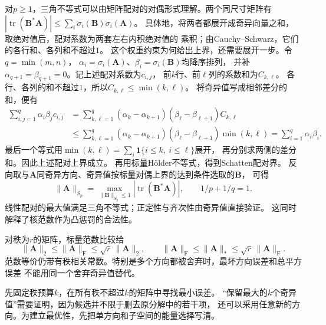 对$p\geq1$，三角不等式可以由矩阵配对的对偶形式理解。两个同尺寸矩阵有
$|\operatorname{tr}(\bm B^*\bm A)|
\leq\sum_i\sigma_i(\bm B)\sigma_i(\bm A)$。
具体地，将两者都展开成奇异向量之和，取绝对值后，配对系数为两套左右内积绝对值的
乘积；由Cauchy--Schwarz，它们的各行和、各列和不超过$1$。
这个权重约束为何给出上界，还需要展开一步。令$q=\min(m,n)$，
$\alpha_i=\sigma_i(\bm A)$、$\beta_i=\sigma_i(\bm B)$均降序排列，
并补$\alpha_{q+1}=\beta_{q+1}=0$。记上述配对系数为$c_{i,j}$，
前$k$行、前$\ell$列的系数和为$C_{k,\ell}$。
各行、各列的和不超过$1$，所以$C_{k,\ell}\leq\min(k,\ell)$。
将奇异值写成相邻差分的和，便有
\[
 \begin{aligned}
 \sum_{i,j=1}^q\alpha_i\beta_jc_{i,j}
 &=\sum_{k,\ell=1}^q(\alpha_k-\alpha_{k+1})
                      (\beta_\ell-\beta_{\ell+1})C_{k,\ell}\\
 &\leq\sum_{k,\ell=1}^q(\alpha_k-\alpha_{k+1})
                      (\beta_\ell-\beta_{\ell+1})\min(k,\ell)
 =\sum_{i=1}^q\alpha_i\beta_i.
 \end{aligned}
\]
最后一个等式用$\min(k,\ell)=\sum_i\mathbf1\{i\leq k,\ i\leq\ell\}$展开，
再分别求两侧的差分和。因此上述配对上界成立。
再用标量Hölder不等式，得到Schatten配对界。
反向取与$\bm A$同奇异方向、奇异值按标量对偶上界的达到条件选取的$\bm B$，
可得
\[
 \lVert\bm A\rVert_{S_p}
 =\max_{\lVert\bm B\rVert_{S_q}\leq1}
       |\operatorname{tr}(\bm B^*\bm A)|,\qquad 1/p+1/q=1.
\]
线性配对的最大值满足三角不等式；正定性与齐次性由奇异值直接验证。
这同时解释了核范数作为凸惩罚的合法性。

对秩为$r$的矩阵，标量范数比较给
\begin{equation}
 \lVert\bm A\rVert_2\leq\lVert\bm A\rVert_{\mathrm F}
 \leq\sqrt r\,\lVert\bm A\rVert_2,\qquad
 \lVert\bm A\rVert_{\mathrm F}\leq\lVert\bm A\rVert_*
 \leq\sqrt r\,\lVert\bm A\rVert_{\mathrm F}.
 \label{eq:matrix-analysis-norm-rank-relations}
\end{equation}
范数等价仍带有秩相关常数。特别是多个方向都被舍弃时，最坏方向误差和总平方误差
不能用同一个舍弃奇异值替代。


先固定秩预算$k$，在所有秩不超过$k$的矩阵中寻找最小误差。
“保留最大的$k$个奇异值”需要证明，因为候选并不限于删去原分解中的若干项，
还可以采用任意新的方向。为建立最优性，先把单方向和子空间的能量选择写清。

